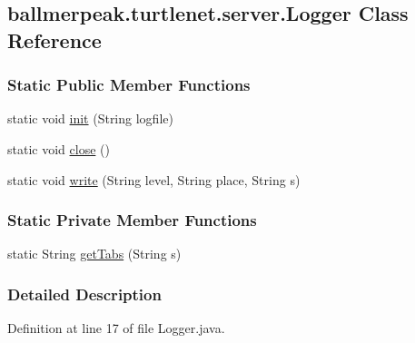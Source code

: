 \hypertarget{classballmerpeak_1_1turtlenet_1_1server_1_1Logger}{\subsection{ballmerpeak.\-turtlenet.\-server.\-Logger Class Reference}
\label{classballmerpeak_1_1turtlenet_1_1server_1_1Logger}
}
\subsubsection*{Static Public Member Functions}
\begin{DoxyCompactItemize}
\item 
static void \hyperlink{classballmerpeak_1_1turtlenet_1_1server_1_1Logger_aa23612b75f5e3ba1d77e1f2dc60ec514}{init} (String logfile)
\item 
static void \hyperlink{classballmerpeak_1_1turtlenet_1_1server_1_1Logger_a529af97ac0cd6d79ca22f47aa75ccfe7}{close} ()
\item 
static void \hyperlink{classballmerpeak_1_1turtlenet_1_1server_1_1Logger_aa3ebd83be6d967692fae7980eb7b146f}{write} (String level, String place, String s)
\end{DoxyCompactItemize}
\subsubsection*{Static Private Member Functions}
\begin{DoxyCompactItemize}
\item 
static String \hyperlink{classballmerpeak_1_1turtlenet_1_1server_1_1Logger_ab10e5c8454d7cdf047b2c53bf040afc0}{get\-Tabs} (String s)
\end{DoxyCompactItemize}


\subsubsection{Detailed Description}


Definition at line 17 of file Logger.\-java.



